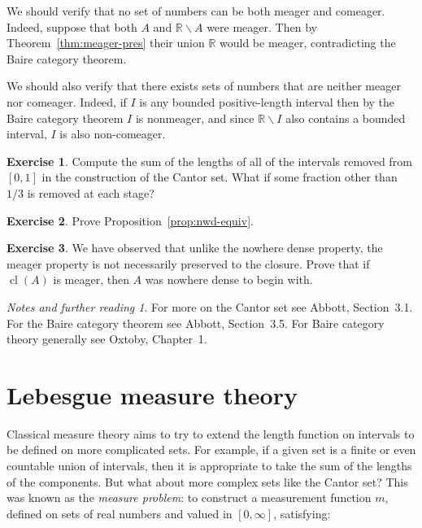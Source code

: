 \documentclass[11pt,oneside]{amsbook}
\newcommand{\R}{\mathbb R}
\DeclareMathOperator{\cl}{cl}
\theoremstyle{definition}
\newtheorem{exerc}{Exercise}[section]
\theoremstyle{plain}
\theoremstyle{definition}
\theoremstyle{remark}
\newtheorem*{notes}{Notes and further reading}
\numberwithin{equation}{section}
\numberwithin{figure}{section}
\begin{document}
We should verify that no set of numbers can be both meager and comeager. Indeed, suppose that both $A$ and $\R\smallsetminus A$ were meager. Then by Theorem~\ref{thm:meager-pres} their union $\R$ would be meager, contradicting the Baire category theorem.

We should also verify that there exists sets of numbers that are neither meager nor comeager. Indeed, if $I$ is any bounded positive-length interval then by the Baire category theorem $I$ is nonmeager, and since $\R\smallsetminus I$ also contains a bounded interval, $I$ is also non-comeager.

\begin{exerc}
  \label{exerc:cantor}
  Compute the sum of the lengths of all of the intervals removed from $[0,1]$ in the construction of the Cantor set. What if some fraction other than $1/3$ is removed at each stage?
\end{exerc}

\begin{exerc}
  \label{exerc:nwd-equiv}
  Prove Proposition~\ref{prop:nwd-equiv}.
\end{exerc}

\begin{exerc}
  We have observed that unlike the nowhere dense property, the meager property is not necessarily preserved to the closure. Prove that if $\cl(A)$ is meager, then $A$ was nowhere dense to begin with.
\end{exerc}

\begin{notes}
  For more on the Cantor set see Abbott, Section~3.1. For the Baire category theorem see Abbott, Section~3.5. For Baire category theory generally see Oxtoby, Chapter~1.
\end{notes}


\newpage
\section{Lebesgue measure theory}

Classical measure theory aims to try to extend the length function on intervals to be defined on more complicated sets. For example, if a given set is a finite or even countable union of intervals, then it is appropriate to take the sum of the lengths of the components. But what about more complex sets like the Cantor set? This was known as the \emph{measure problem}: to construct a measurement function $m$, defined on sets of real numbers and valued in $[0,\infty]$, satisfying:
\end{document}
